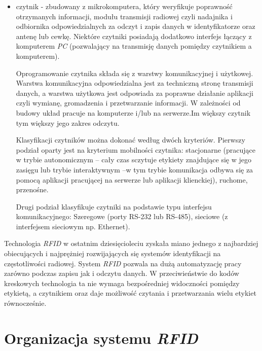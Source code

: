 \begin{itemize}
	\item czytnik  - zbudowany z mikrokomputera, który weryfikuje poprawność otrzymanych informacji, modułu transmisji radiowej czyli nadajnika i odbiornika  odpowiedzialnych za odczyt i zapis danych w identyfikatorze oraz antenę lub cewkę. Niektóre czytniki posiadają dodatkowo interfejs łączący z komputerem \emph{PC} (pozwalający na transmisję danych pomiędzy czytnikiem a komputerem).
	
	Oprogramowanie czytnika składa się z warstwy komunikacyjnej i użytkowej. Warstwa komunikacyjna odpowiedzialna jest za techniczną stronę transmisji danych, a warstwa użytkowa jest odpowiada za poprawne działanie aplikacji czyli wymianę, gromadzenia i przetwarzanie informacji. W zależności od budowy układ pracuje na komputerze i/lub na serwerze.Im większy czytnik tym większy jego zakres odczytu.
	
	Klasyfikacji czytników można dokonać według dwóch kryteriów. Pierwszy podział oparty jest na kryterium mobilności czytnika: stacjonarne (pracujące w trybie autonomicznym – cały czas sczytuje etykiety znajdujące się w jego zasięgu lub trybie interaktywnym –w tym trybie komunikacja odbywa się za pomocą aplikacji pracującej na serwerze lub aplikacji klienckiej), ruchome, przenośne.
	
	Drugi podział klasyfikuje czytniki na podstawie typu interfejsu komunikacyjnego:
	Szeregowe (porty RS-232 lub RS-485), sieciowe (z interfejsem sieciowym np. Ethernet).

\end{itemize}

Technologia \emph{RFID} w ostatnim dziesięcioleciu zyskała miano jednego z najbardziej obiecujących i najprężniej rozwijających się systemów identyfikacji na częstotliwości radiowej.  System \emph{RFID} pozwala na dużą automatyzację pracy zarówno podczas zapisu jak i odczytu danych. W przeciwieństwie do kodów kreskowych technologia ta nie wymaga bezpośredniej widoczności pomiędzy etykietą, a czytnikiem oraz daje możliwość czytania i przetwarzania wielu etykiet równocześnie.

\section{Organizacja systemu \emph{RFID}}

